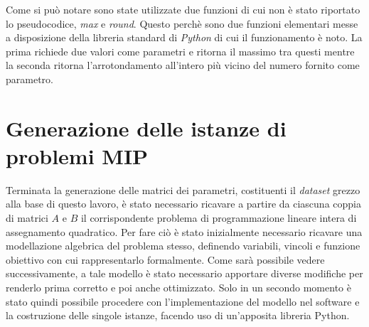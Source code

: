 Come si può notare sono state utilizzate due funzioni di cui non è stato riportato lo pseudocodice, \textit{max} e \textit{round}.
Questo perchè sono due funzioni elementari messe a disposizione della libreria standard di \textit{Python} \cite{python} di cui il 
funzionamento è noto. La prima richiede due valori come parametri e ritorna il massimo tra questi mentre la seconda ritorna 
l'arrotondamento all'intero più vicino del numero fornito come parametro.



\newpage
\section{Generazione delle istanze di problemi MIP}
Terminata la generazione delle matrici dei parametri, costituenti il \textit{dataset} grezzo alla base di questo lavoro, è stato necessario ricavare a 
partire da ciascuna coppia di matrici $A$ e $B$ il corrispondente problema di programmazione lineare intera di assegnamento quadratico. Per fare ciò è stato 
inizialmente necessario ricavare una modellazione algebrica del problema stesso, definendo variabili, vincoli e funzione obiettivo con cui 
rappresentarlo formalmente. Come sarà possibile vedere successivamente, a tale modello è stato necessario apportare diverse modifiche per renderlo
prima corretto e poi anche ottimizzato. Solo in un secondo momento è stato quindi possibile procedere con l'implementazione del modello nel software 
e la costruzione delle singole istanze, facendo uso di un'apposita libreria Python.

